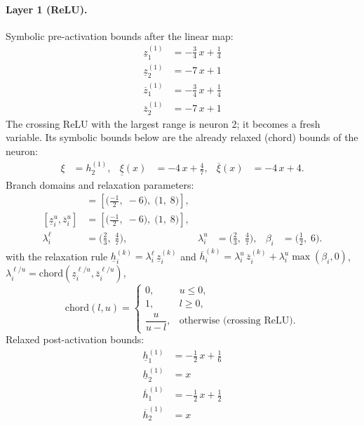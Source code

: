 \documentclass[11pt]{article}
\begin{document}
\paragraph{Layer 1 (ReLU).}
Symbolic pre-activation bounds after the linear map:
\begin{align*}
\underline{z}^{(1)}_{1} &= -\frac{3}{4}\,x + \frac{1}{4} \\
\underline{z}^{(1)}_{2} &= -7\,x + 1
\end{align*}
\begin{align*}
\overline{z}^{(1)}_{1} &= -\frac{3}{4}\,x + \frac{1}{4} \\
\overline{z}^{(1)}_{2} &= -7\,x + 1
\end{align*}
The crossing ReLU with the largest range is neuron 2; it becomes a fresh variable. Its symbolic bounds below are the already relaxed (chord) bounds of the neuron:
\begin{align*}
\xi &= h^{(1)}_{2}, & \underline{\xi}(x) &= -4\,x + \frac{4}{7}, & \overline{\xi}(x) &= -4\,x + 4.
\end{align*}
Branch domains and relaxation parameters:
\begin{align*}
[\underline{z}^{\ell}_i, \overline{z}^{\ell}_i] &= [\bigl(\frac{-1}{2},\; -6\bigr),\; \bigl(1,\; 8\bigr)], \\ 
[\underline{z}^{u}_i, \overline{z}^{u}_i] &= [\bigl(\frac{-1}{2},\; -6\bigr),\; \bigl(1,\; 8\bigr)], \\
\lambda^{\ell}_i &= \bigl(\frac{2}{3},\; \frac{4}{7}\bigr), & \lambda^{u}_i &= \bigl(\frac{2}{3},\; \frac{4}{7}\bigr), & \beta_i &= \bigl(\frac{1}{2},\; 6\bigr).
\end{align*}
with the relaxation rule
$\underline{h}^{(k)}_i = \lambda^{\ell}_i\, \underline{z}^{(k)}_i$ and
$\overline{h}^{(k)}_i = \lambda^{u}_i\, \overline{z}^{(k)}_i + \lambda^{u}_i \max(\beta_i, 0)$,
$\lambda^{\ell/u}_i = \mathrm{chord}(\underline{z}_i^{\ell/u}, \overline{z}_i^{\ell/u})$,
\[
\mathrm{chord}(l, u) =
\begin{cases}
0, & u \le 0,\\
1, & l \ge 0,\\
\dfrac{u}{u - l}, & \text{otherwise (crossing ReLU)}.
\end{cases}\]
Relaxed post-activation bounds:
\begin{align*}
\underline{h}^{(1)}_{1} &= -\frac{1}{2}\,x + \frac{1}{6} \\
\underline{h}^{(1)}_{2} &= x
\end{align*}
\begin{align*}
\overline{h}^{(1)}_{1} &= -\frac{1}{2}\,x + \frac{1}{2} \\
\overline{h}^{(1)}_{2} &= x
\end{align*}
\end{document}

